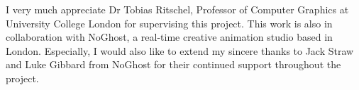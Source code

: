 \begin{acknowledgements}
I very much appreciate Dr Tobias Ritschel, Professor of Computer Graphics at University College London for supervising this project. This work is also in collaboration with NoGhost, a real-time creative animation studio based in London. Especially, I would also like to extend my sincere thanks to Jack Straw and Luke Gibbard from NoGhost for their continued support throughout the project.
\end{acknowledgements}



\setcounter{tocdepth}{2} 

\tableofcontents

\listoffigures





